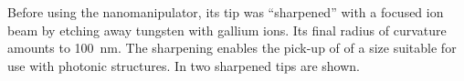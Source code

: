 		Before using the nanomanipulator, its tip was ``sharpened'' with a focused ion beam by etching away tungsten with gallium ions. Its final radius of curvature amounts to \SI{100}{\nano\meter}. The sharpening enables the pick-up of \nds of a size suitable for use with photonic structures.
		In  two sharpened tips are shown.

		\begin{figure}[!htb]
			\begin{subfigure}[t]{ 0.49\linewidth}
				\centering
				\caption{}
				\label{subfig::nanomanipulator_tip}
			\end{subfigure}
			\hfill
			\begin{subfigure}[t]{ 0.49\linewidth}
				\centering

\end{subfigure}
\end{figure}
